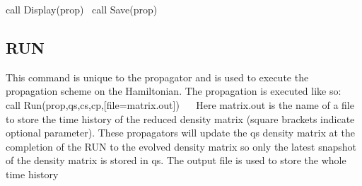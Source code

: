  call Display(prop)~\newline
 call Save(prop)~\newline
~\newline
\hypertarget{_interface_RUN}{}\subsection{R\+UN}\label{_interface_RUN}
This command is unique to the propagator and is used to execute the propagation scheme on the Hamiltonian. The propagation is executed like so\+:~\newline
~\newline
 call Run(prop,qs,cs,cp,\mbox{[}file=\textquotesingle{}matrix.\+out\textquotesingle{}\mbox{]})~\newline
~\newline
Here \textquotesingle{}matrix.\+out\textquotesingle{} is the name of a file to store the time history of the reduced density matrix (square brackets indicate optional parameter). These propagators will update the qs density matrix at the completion of the R\+UN to the evolved density matrix so only the latest snapshot of the density matrix is stored in qs. The output file is used to store the whole time history~\newline
~\newline

